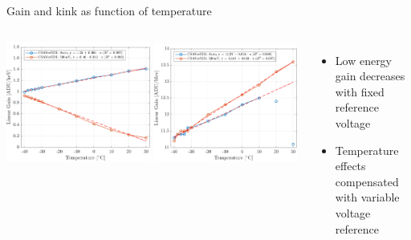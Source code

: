 \documentclass[aspectratio=169,xcolor=dvipsnames]{beamer} %
\newcommand{\xmark}{\ding{55}}
\newcommand{\greencheck}{{\color{ForestGreen}\checkmark}}
\newcommand{\redcross}{{\color{Red}\xmark}}
\begin{document}
\begin{frame}{Gain and kink as function of temperature}
\begin{columns}
            \vspace{-0.3cm}
            \begin{center}
                \includegraphics[width=0.49\textwidth]{images/temperature_effects/low_energy_gain_auto_530mV.pdf}
                \includegraphics[width=0.49\textwidth]{images/temperature_effects/high_energy_gain_auto_530mV.pdf}
            \end{center}

            \vskip-0.3cm
            \addtolength{\leftmargini}{\labelsep}
            \begin{itemize}
                \item Low energy gain decreases with fixed reference voltage \redcross
                \item Temperature effects compensated with variable voltage reference \greencheck
            \end{itemize}
            \vskip0.1cm


\end{columns}
\end{frame}
\end{document}
